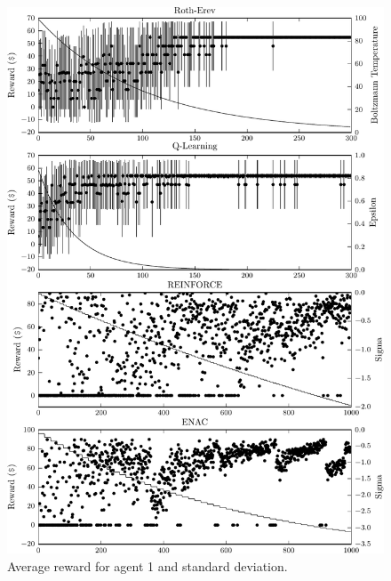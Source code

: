 {%
	\begin{figure}
	  \centering
	  \includegraphics{figures/fig5_2_reward_a1}
	  \caption{Average reward for agent 1 and standard deviation.}
	  \label{fig:5_2_reward_a1}
	\end{figure}
}{}

